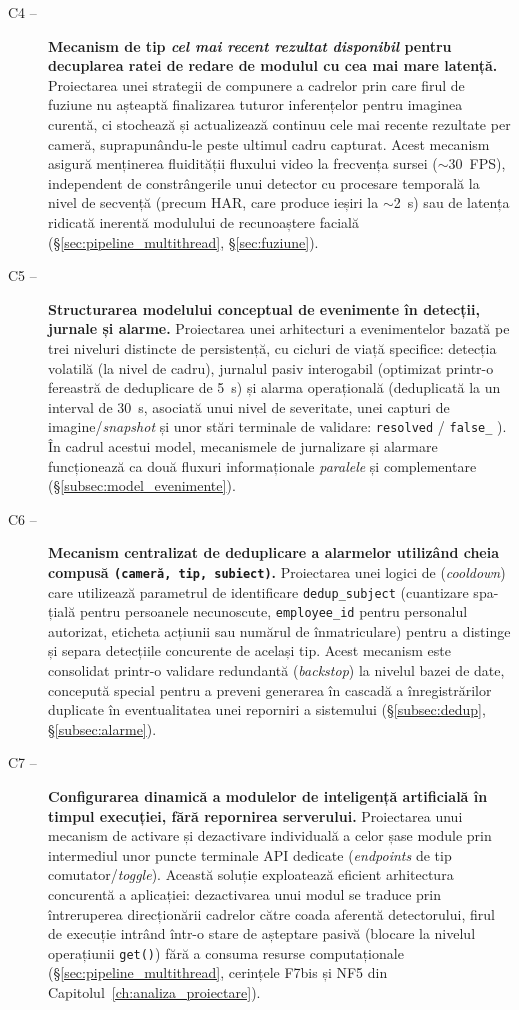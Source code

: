 \documentclass[../../main.tex]{subfiles}
\begin{document}
\begin{description}
	\item[C4 --] \textbf{Mecanism de tip \emph{cel mai recent rezultat disponibil} pentru decuplarea ratei de redare de modulul cu cea mai mare latență.} Proiectarea unei strategii de compunere a cadrelor prin care firul de fuziune nu așteaptă finalizarea tuturor inferențelor pentru imaginea curentă, ci stochează și actualizează continuu cele mai recente rezultate per cameră, suprapunându-le peste ultimul cadru capturat. Acest mecanism asigură menținerea fluidității fluxului video la frecvența sursei ($\sim$30~FPS), independent de constrângerile unui detector cu procesare temporală la nivel de secvență (precum HAR, care produce ieșiri la $\sim$2~s) sau de latența ridicată inerentă modulului de recunoaștere facială (\S\ref{sec:pipeline_multithread}, \S\ref{sec:fuziune}).

	\item[C5 --] \textbf{Structurarea modelului conceptual de evenimente în detecții, jurnale și alarme.} Proiectarea unei arhitecturi a evenimentelor bazată pe trei niveluri distincte de persistență, cu cicluri de viață specifice: detecția volatilă (la nivel de cadru), jurnalul pasiv interogabil (optimizat printr-o fereastră de deduplicare de 5~s) și alarma operațională (deduplicată la un interval de 30~s, asociată unui nivel de severitate, unei capturi de imagine/\textit{snapshot} și unor stări terminale de validare: \texttt{resolved} / \texttt{false\_} ). În cadrul acestui model, mecanismele de jurnalizare și alarmare funcționează ca două fluxuri informaționale \emph{paralele} și complementare (\S\ref{subsec:model_evenimente}).	

	\item[C6 --] \textbf{Mecanism centralizat de deduplicare a alarmelor utilizând cheia compusă \texttt{(cameră, tip, subiect)}.} Proiectarea unei logici de (\textit{cooldown}) care utilizează parametrul de identificare \texttt{dedup\_subject} (cuantizare spa-țială pentru persoanele necunoscute, \texttt{employee\_id} pentru personalul autorizat, eticheta acțiunii sau numărul de înmatriculare) pentru a distinge și separa detecțiile concurente de același tip. Acest mecanism este consolidat printr-o validare redundantă (\textit{backstop}) la nivelul bazei de date, concepută special pentru a preveni generarea în cascadă a înregistrărilor duplicate în eventualitatea unei reporniri a sistemului (\S\ref{subsec:dedup}, \S\ref{subsec:alarme}).

	\item[C7 --] \textbf{Configurarea dinamică a modulelor de inteligență artificială în timpul execuției, fără repornirea serverului.} Proiectarea unui mecanism de activare și dezactivare individuală a celor șase module prin intermediul unor puncte terminale API dedicate (\textit{endpoints} de tip comutator/\textit{toggle}). Această soluție exploatează eficient arhitectura concurentă a aplicației: dezactivarea unui modul se traduce prin întreruperea direcționării cadrelor către coada aferentă detectorului, firul de execuție intrând într-o stare de așteptare pasivă (blocare la nivelul operațiunii \texttt{get()}) fără a consuma resurse computaționale (\S\ref{sec:pipeline_multithread}, cerințele F7bis și NF5 din Capitolul~\ref{ch:analiza_proiectare}).


\end{description}
\end{document}
